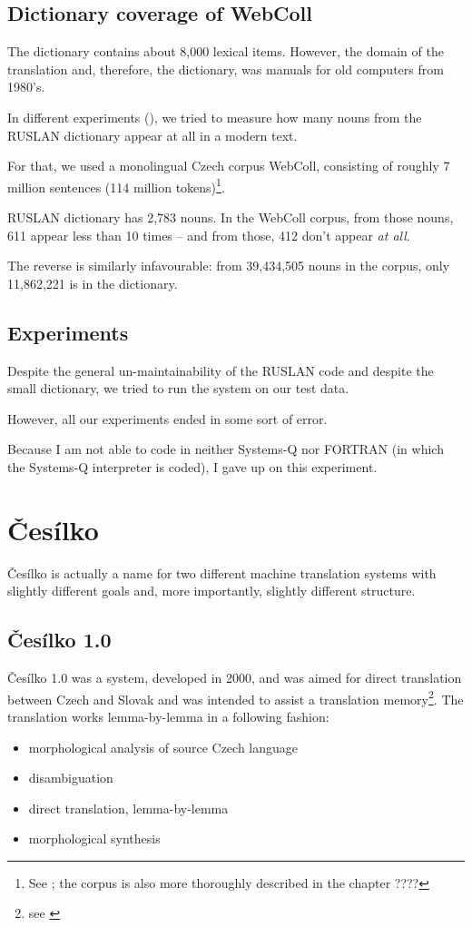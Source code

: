\subsection{Dictionary coverage of WebColl}

The dictionary contains about 8,000 lexical items. However, the domain of the translation and, therefore, the dictionary, was manuals for old computers from 1980's. 

In different experiments (\cite{florida}), we tried to measure how many nouns from the RUSLAN dictionary appear at all in a modern text.

For that, we used a monolingual Czech corpus WebColl, consisting of roughly 7 million sentences (114 million tokens)\footnote{See \cite{webcoll}; the corpus is also more thoroughly described in the chapter ????}.

RUSLAN dictionary has 2,783 nouns. In the WebColl corpus, from those nouns, 611 appear less than 10 times -- and from those, 412 don't appear \emph{at all}.

The reverse is similarly infavourable: from 39,434,505 nouns in the corpus, only 11,862,221 is in the dictionary.

\subsection{Experiments}

Despite the general un-maintainability of the RUSLAN code and despite the small dictionary, we tried to run the system on our test data.

However, all our experiments ended in some sort of error.

Because I am not able to code in neither Systems-Q nor FORTRAN (in which the Systems-Q interpreter is coded), I gave up on this experiment.


\section{Česílko}

Česílko is actually a name for two different machine translation systems with slightly different goals and, more importantly, slightly different structure.

\subsection{Česílko 1.0}
Česílko 1.0 was a system, developed in 2000, and was aimed for direct translation between Czech and Slovak and was intended to assist a translation memory\footnote{see \cite{cesilko1}}. The translation works lemma-by-lemma in a following fashion:
\begin{itemize}
\item morphological analysis of source Czech language
\item disambiguation
\item direct translation, lemma-by-lemma
\item morphological synthesis
\end{itemize}



